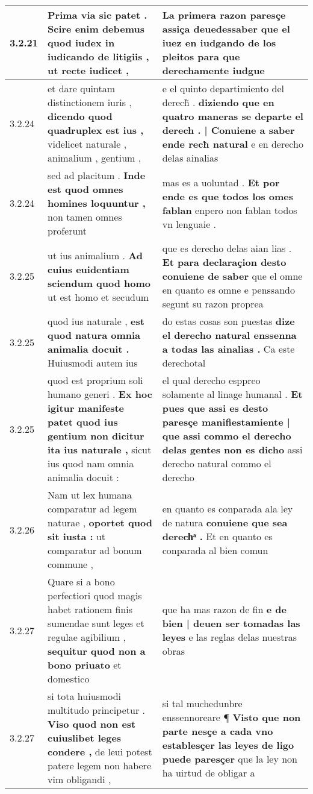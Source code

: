 \begin{tabular}{|p{1cm}|p{6.5cm}|p{6.5cm}|}
3.2.21 & Prima via sic patet . \textbf{ Scire enim debemus quod iudex in iudicando de litigiis , } ut recte iudicet , & La primera razon paresçe assiça deuedessaber \textbf{ que el iuez en iudgando de los pleitos } para que derechamente iudgue \\\hline
3.2.24 & et dare quintam distinctionem iuris , \textbf{ dicendo quod quadruplex est ius , } videlicet naturale , animalium , gentium , & e el quinto departimiento del derech̃ . \textbf{ diziendo que en quatro maneras se departe el derech . | Conuiene a saber ende recħ natural } e en derecho delas ainalias \\\hline
3.2.24 & sed ad placitum . \textbf{ Inde est quod omnes homines loquuntur , } non tamen omnes proferunt & mas es a uoluntad . \textbf{ Et por ende es que todos los omes fablan } enpero non fablan todos vn lenguaie . \\\hline
3.2.25 & ut ius animalium . \textbf{ Ad cuius euidentiam sciendum quod homo } ut est homo et secudum & que es derecho delas aian lias . \textbf{ Et para declaraçion desto conuiene de saber } que el omne en quanto es omne e penssando segunt su razon proprea \\\hline
3.2.25 & quod ius naturale , \textbf{ est quod natura omnia animalia docuit . } Huiusmodi autem ius & do estas cosas son puestas \textbf{ dize el derecho natural enssenna a todas las ainalias . } Ca este derechotal \\\hline
3.2.25 & quod est proprium soli humano generi . \textbf{ Ex hoc igitur manifeste patet quod ius gentium non dicitur ita ius naturale , } sicut ius quod nam omnia animalia docuit : & el qual derecho esppreo solamente al linage humanal . \textbf{ Et pues que assi es desto paresçe manifiestamiente | que assi commo el derecho delas gentes non es dicho } assi derecho natural commo el derecho \\\hline
3.2.26 & Nam ut lex humana comparatur ad legem naturae , \textbf{ oportet quod sit iusta : } ut comparatur ad bonum commune , & en quanto es conparada ala ley de natura \textbf{ conuiene que sea derechͣ . } Et en quanto es conparada al bien comun \\\hline
3.2.27 & Quare si a bono perfectiori quod magis habet rationem finis sumendae sunt leges et regulae agibilium , \textbf{ sequitur quod non a bono priuato } et domestico & que ha mas razon de fin \textbf{ e de bien | deuen ser tomadas las leyes } e las reglas delas nuestras obras \\\hline
3.2.27 & si tota huiusmodi multitudo principetur . \textbf{ Viso quod non est cuiuslibet leges condere , } de leui potest patere legem non habere vim obligandi , & si tal muchedunbre enssennoreare ¶ \textbf{ Visto que non parte nesçe a cada vno establesçer las leyes de ligo puede paresçer } que la ley non ha uirtud de obligar a \\\hline

\end{tabular}
